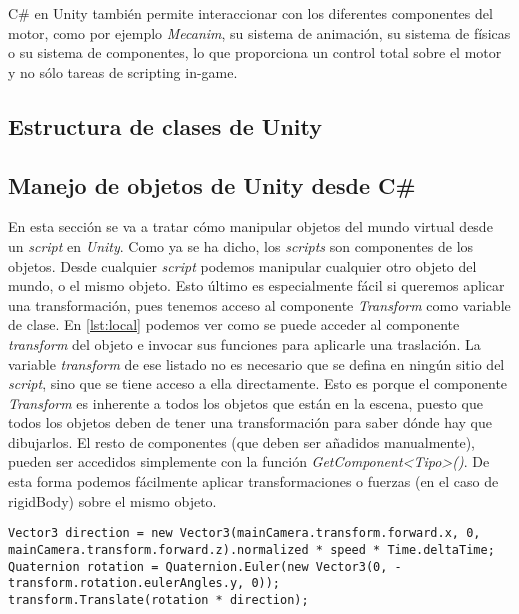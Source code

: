 \documentclass{pre-tfg}
\begin{document}
C\# en Unity también permite interaccionar con los diferentes componentes del motor, como por ejemplo \emph{Mecanim}, su sistema de animación, su sistema de físicas o su sistema de componentes, lo que proporciona un control total sobre el motor y no sólo tareas de scripting in-game.

\subsection{Estructura de clases de Unity}

\subsection{Manejo de objetos de Unity desde C\#}

En esta sección se va a tratar c\'omo manipular objetos del mundo virtual desde un \textit{script} en \textit{Unity}. Como ya se ha dicho, los \textit{scripts} son componentes de los objetos. Desde cualquier \textit{script} podemos manipular cualquier otro objeto del mundo, o el mismo objeto. Esto último es especialmente f\'acil si queremos aplicar una transformación, pues tenemos acceso al componente \textit{Transform} como variable de clase. En \ref{lst:local} podemos ver como se puede acceder al componente \textit{transform} del objeto e invocar sus funciones para aplicarle una traslación. La variable \textit{transform} de ese listado no es necesario que se defina en ningún sitio del \textit{script}, sino que se tiene acceso a ella directamente. Esto es porque el componente \textit{Transform} es inherente a todos los objetos que están en la escena, puesto que todos los objetos deben de tener una transformación para saber dónde hay que dibujarlos. El resto de componentes (que deben ser añadidos manualmente), pueden ser accedidos simplemente con la función \textit{GetComponent<Tipo>()}. De esta forma podemos fácilmente aplicar transformaciones o fuerzas (en el caso de rigidBody) sobre el mismo objeto.

\begin{lstlisting}[float=htbp, caption={Acceso al componente transform para modificar el propio objeto}, label=lst:local]
Vector3 direction = new Vector3(mainCamera.transform.forward.x, 0, mainCamera.transform.forward.z).normalized * speed * Time.deltaTime;
Quaternion rotation = Quaternion.Euler(new Vector3(0, -transform.rotation.eulerAngles.y, 0));
transform.Translate(rotation * direction);
\end{lstlisting}
\end{document}
